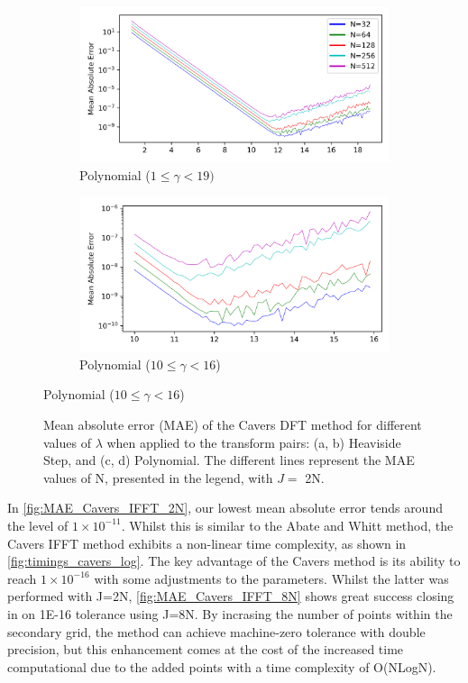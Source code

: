 \documentclass[a4paper]{report}
\begin{document}
\begin{figure}[H]
    \begin{subfigure}{.45\linewidth}
      \includegraphics[width=\linewidth]{images/cavers/polynomial_dft.png}
      \caption{Polynomial ($1 \leq \gamma < 19)$}
    \end{subfigure}\hfill
    \begin{subfigure}{.45\linewidth}
      \includegraphics[width=\linewidth]{images/cavers/polynomial_zoomed_dft.png}
      \caption{Polynomial ($10 \leq \gamma < 16$)}
    \end{subfigure}
\end{figure}

\begin{figure}[H]\ContinuedFloat
    \caption{Mean absolute error (MAE) of the Cavers DFT method for different values of $\lambda$ when applied to the transform pairs: (a, b) Heaviside Step, and (c, d) Polynomial. The different lines represent the MAE values of N, presented in the legend, with $J =$ 2N.}
    \label{fig:MAE_Cavers_DFT_2N}
\end{figure}
\vspace{-1.5em}

In \autoref{fig:MAE_Cavers_IFFT_2N}, our lowest mean absolute error tends around the level of $1 \times 10^{-11}$. Whilst this is similar to the Abate and Whitt method, the Cavers IFFT method exhibits a non-linear time complexity, as shown in \autoref{fig:timings_cavers_log}. The key advantage of the Cavers method is its ability to reach $1 \times 10^{-16}$ with some adjustments to the parameters. Whilst the latter was performed with J=2N, \autoref{fig:MAE_Cavers_IFFT_8N} shows great success closing in on 1E-16 tolerance using J=8N. By incrasing the number of points within the secondary grid, the method can achieve machine-zero tolerance with double precision, but this enhancement comes at the cost of the increased time computational due to the added points with a time complexity of O(NLogN).
\end{document}
